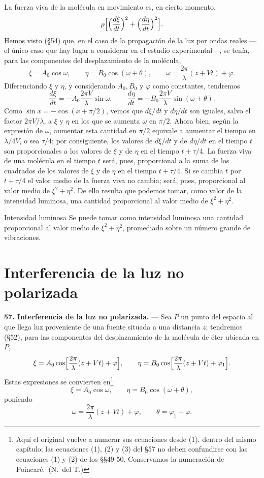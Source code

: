 La fuerza viva de la molécula en movimiento es, en cierto momento,
\[
\rho\Bigl[\Bigl(\frac{d\xi}{dt}\Bigr)^2+\Bigl(\frac{d\eta}{dt}\Bigr)^2\Bigr].
\]
Hemos visto (§54) que, en el caso de la propagación de la luz por ondas
reales —el único caso que hay lugar a considerar en el estudio
experimental—, se tenía, para las componentes del desplazamiento de la
molécula,
\[
\xi=A_0\cos\omega,\qquad \eta=B_0\cos(\omega+\theta),
\qquad \omega=\frac{2\pi}{\lambda}(z+Vt)+\varphi.
\]
Diferenciando $\xi$ y $\eta$, y considerando $A_0,B_0$ y $\varphi$ como
constantes, tendremos
\[
\frac{d\xi}{dt}=-A_0\frac{2\pi V}{\lambda}\sin\omega,\qquad
\frac{d\eta}{dt}=-B_0\frac{2\pi V}{\lambda}\sin(\omega+\theta).
\]
Como $\sin x=-\cos(x+\pi/2)$, vemos que $d\xi/dt$ y $d\eta/dt$ son
iguales, salvo el factor $2\pi V/\lambda$, a $\xi$ y $\eta$ en los que se
aumenta $\omega$ en $\pi/2$. Ahora bien, según la expresión de $\omega$,
aumentar esta cantidad en $\pi/2$ equivale a aumentar el tiempo en
$\lambda/4V$, o sea $\tau/4$; por consiguiente, los valores de $d\xi/dt$
y de $d\eta/dt$ en el tiempo $t$ son proporcionales a los valores de
$\xi$ y de $\eta$ en el tiempo $t+\tau/4$. La fuerza viva de una molécula
en el tiempo $t$ será, pues, proporcional a la suma de los cuadrados de
los valores de $\xi$ y de $\eta$ en el tiempo $t+\tau/4$. Si se cambia
$t$ por $t+\tau/4$ el valor medio de la fuerza viva no cambia; será, pues,
proporcional al valor medio de $\xi^2+\eta^2$. De ello resulta que
podemos tomar, como valor de la intensidad luminosa, una cantidad
proporcional al valor medio de $\xi^2+\eta^2$.

\begin{enunciado}{Intensidad luminosa}
Se puede tomar como intensidad luminosa una cantidad proporcional al valor
medio de $\xi^2+\eta^2$, promediado sobre un número grande de vibraciones.
\end{enunciado}

\section{Interferencia de la luz no polarizada}

\noindent\textbf{57. Interferencia de la luz no polarizada.} — Sea $P$ un
punto del espacio al que llega luz proveniente de una fuente situada a
una distancia $z$; tendremos (§52), para las componentes del
desplazamiento de la molécula de éter ubicada en $P$,
\[
\xi=A_0\cos\Bigl[\frac{2\pi}{\lambda}(z+Vt)+\varphi\Bigr],\qquad
\eta=B_0\cos\Bigl[\frac{2\pi}{\lambda}(z+Vt)+\varphi_1\Bigr].
\]
Estas expresiones se convierten en\footnote{Aquí el original vuelve a
numerar sus ecuaciones desde (1), dentro del mismo capítulo; las
ecuaciones (1), (2) y (3) del §57 no deben confundirse con las
ecuaciones (1) y (2) de los §§49-50. Conservamos la numeración de
Poincaré.~(N.~del T.)}
\begin{equation}
\xi=A_0\cos\omega,\qquad \eta=B_0\cos(\omega+\theta),
\tag{1}
\end{equation}
poniendo
\[
\omega=\frac{2\pi}{\lambda}(z+Vt)+\varphi,\qquad \theta=\varphi_1-\varphi.
\]


